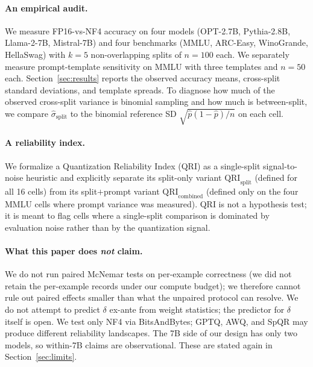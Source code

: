 \documentclass{article}
\begin{document}
\paragraph{An empirical audit.}
We measure FP16-vs-NF4 accuracy on four models (OPT-2.7B, Pythia-2.8B, Llama-2-7B, Mistral-7B) and four benchmarks (MMLU, ARC-Easy, WinoGrande, HellaSwag) with $k{=}5$ non-overlapping splits of $n{=}100$ each. We separately measure prompt-template sensitivity on MMLU with three templates and $n{=}50$ each. Section~\ref{sec:results} reports the observed accuracy means, cross-split standard deviations, and template spreads. To diagnose how much of the observed cross-split variance is binomial sampling and how much is between-split, we compare $\hat\sigma_{\text{split}}$ to the binomial reference SD $\sqrt{\hat p(1-\hat p)/n}$ on each cell.

\paragraph{A reliability index.}
We formalize a Quantization Reliability Index (QRI) as a single-split signal-to-noise heuristic and explicitly separate its split-only variant $\mathrm{QRI}_{\text{split}}$ (defined for all 16 cells) from its split$+$prompt variant $\mathrm{QRI}_{\text{combined}}$ (defined only on the four MMLU cells where prompt variance was measured). QRI is not a hypothesis test; it is meant to flag cells where a single-split comparison is dominated by evaluation noise rather than by the quantization signal.

\paragraph{What this paper does \emph{not} claim.}
We do not run paired McNemar tests on per-example correctness (we did not retain the per-example records under our compute budget); we therefore cannot rule out paired effects smaller than what the unpaired protocol can resolve. We do not attempt to predict $\delta$ ex-ante from weight statistics; the predictor for $\delta$ itself is open. We test only NF4 via BitsAndBytes; GPTQ, AWQ, and SpQR may produce different reliability landscapes. The 7B side of our design has only two models, so within-7B claims are observational. These are stated again in Section~\ref{sec:limits}.
\end{document}
